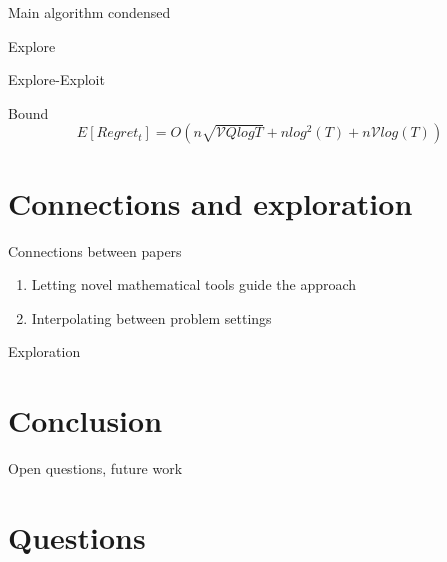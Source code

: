 \documentclass{beamer}
\begin{document}
\begin{frame}{Main algorithm condensed}
  
\end{frame}

\begin{frame}{Explore}
  
\end{frame}
\begin{frame}{Explore-Exploit}
  
\end{frame}


\begin{frame}{Bound}
  \begin{equation}
    E[Regret_t] = O(n \sqrt{\mathcal{V}Q log T} + n log^2(T) + n \mathcal{V}log(T))
  \end{equation}
\end{frame}

\section{Connections and exploration}
\begin{frame}{Connections between papers}
  \begin{enumerate}
  \item
    Letting novel mathematical tools guide the approach
  \item 
    Interpolating between problem settings
  \end{enumerate}
\end{frame}

\begin{frame}{Exploration}
\end{frame}

\section{Conclusion}
\begin{frame}{Open questions, future work}
\end{frame}

\section{Questions}
\end{document}
